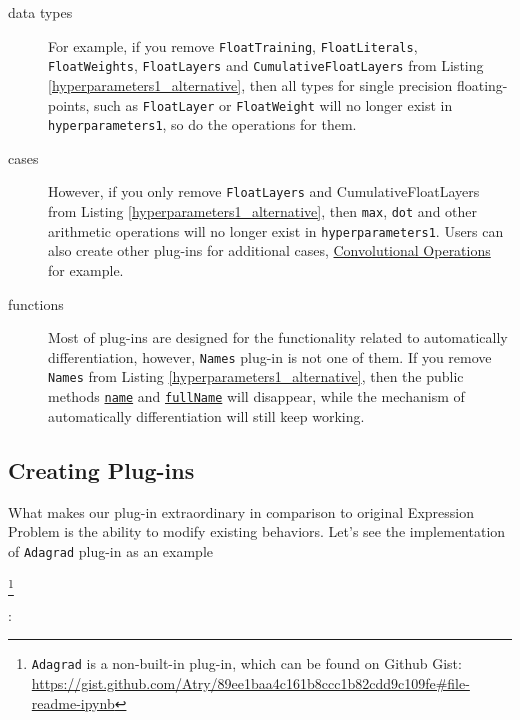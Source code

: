 \begin{description}
  
  \item[data types] For example, if you remove \lstinline{FloatTraining}, \lstinline{FloatLiterals},  \lstinline{FloatWeights}, \lstinline{FloatLayers} and \lstinline{CumulativeFloatLayers} from Listing \ref{hyperparameters1_alternative}, then all types for single precision floating-points, such as  \lstinline{FloatLayer} or \lstinline{FloatWeight} will no longer exist in \lstinline{hyperparameters1}, so do the operations for them.

  \item[cases] However, if you only remove \lstinline{FloatLayers} and {CumulativeFloatLayers} from Listing \ref{hyperparameters1_alternative}, then \lstinline{max}, \lstinline{dot} and other arithmetic operations will no longer exist in \lstinline{hyperparameters1}. Users can also create other \glspl{plug-in} for additional cases, \href{https://gist.github.com/Atry/15b7d9a4c63d95ad3d67e94bf20b4f69#file-readme-ipynb}{Convolutional Operations} for example.
  
  \item[functions] Most of \glspl{plug-in} are designed for the functionality related to automatically differentiation, however, \lstinline{Names} \gls{plug-in} is not one of them. If you remove \lstinline{Names} from Listing \ref{hyperparameters1_alternative}, then the public methods \href{https://javadoc.io/page/com.thoughtworks.deeplearning/deeplearning_2.11/latest/com/thoughtworks/deeplearning/plugins/Names$Layer.html#name:sourcecode.Name}{\lstinline{name}} and \href{https://javadoc.io/page/com.thoughtworks.deeplearning/deeplearning_2.11/latest/com/thoughtworks/deeplearning/plugins/Names$Layer.html#fullName:sourcecode.FullName}{\lstinline{fullName}} will disappear, while the mechanism of automatically differentiation will still keep working.

\end{description}


\subsection{Creating Plug-ins}

What makes our \gls{plug-in} extraordinary in comparison to original Expression Problem is the ability to modify existing behaviors. Let's see the implementation of \lstinline{Adagrad} \gls{plug-in} as an example
\begin{anonsuppress}
  \footnote{\lstinline{Adagrad} is a non-built-in \gls{plug-in}, which can be found on Github Gist: \url{https://gist.github.com/Atry/89ee1baa4c161b8ccc1b82cdd9c109fe\#file-readme-ipynb}}
\end{anonsuppress}
:

